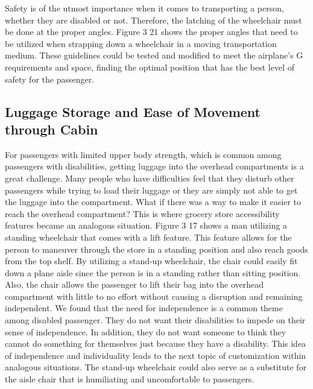 \documentclass[a4paper, 12pt,conference]{new_cit_thesis}
\begin{document}
Safety is of the utmost importance when it comes to transporting a person, whether they are disabled or not. Therefore, the latching of the wheelchair must be done at the proper angles. Figure 3 21 shows the proper angles that need to be utilized when strapping down a wheelchair in a moving transportation medium.  These guidelines could be tested and modified to meet the airplane's G requirements and space, finding the optimal position that has the best level of safety for the passenger.

\subsection{Luggage Storage and Ease of Movement through Cabin}
For passengers with limited upper body strength, which is common among passengers with disabilities, getting luggage into the overhead compartments is a great challenge.  Many people who have difficulties feel that they disturb other passengers while trying to load their luggage or they are simply not able to get the luggage into the compartment. What if there was a way to make it easier to reach the overhead compartment? This is where grocery store accessibility features became an analogous situation.  Figure 3 17 shows a man utilizing a standing wheelchair that comes with a lift feature.  This feature allows for the person to maneuver through the store in a standing position and also reach goods from the top shelf.  By utilizing a stand-up wheelchair, the chair could easily fit down a plane aisle since the person is in a standing rather than sitting position.  Also, the chair allows the passenger to lift their bag into the overhead compartment with little to no effort without causing a disruption and remaining independent. We found that the need for independence is a common theme among disabled passenger. They do not want their disabilities to impede on their sense of independence. In addition, they do not want someone to think they cannot do something for themselves just because they have a disability. This idea of independence and individuality leads to the next topic of customization within analogous situations.  The stand-up wheelchair could also serve as a substitute for the aisle chair that is humiliating and uncomfortable to passengers. 
\end{document}
